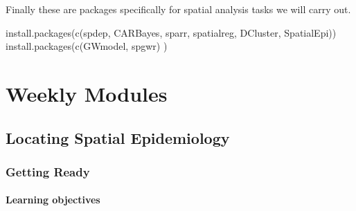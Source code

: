 \documentclass[
]{book}
\newenvironment{Shaded}{\begin{snugshade}}{\end{snugshade}}
\newcommand{\FunctionTok}[1]{\textcolor[rgb]{0.00,0.00,0.00}{#1}}
\newcommand{\NormalTok}[1]{#1}
\newcommand{\StringTok}[1]{\textcolor[rgb]{0.31,0.60,0.02}{#1}}
\begin{document}
Finally these are packages specifically for spatial analysis tasks we will carry out.

\begin{Shaded}
\begin{Highlighting}[]
\FunctionTok{install.packages}\NormalTok{(}\FunctionTok{c}\NormalTok{(}\StringTok{\textquotesingle{}spdep\textquotesingle{}}\NormalTok{, }\StringTok{\textquotesingle{}CARBayes\textquotesingle{}}\NormalTok{, }\StringTok{\textquotesingle{}sparr\textquotesingle{}}\NormalTok{, }\StringTok{\textquotesingle{}spatialreg\textquotesingle{}}\NormalTok{,  }\StringTok{\textquotesingle{}DCluster\textquotesingle{}}\NormalTok{, }\StringTok{\textquotesingle{}SpatialEpi\textquotesingle{}}\NormalTok{))}
\FunctionTok{install.packages}\NormalTok{(}\FunctionTok{c}\NormalTok{(}\StringTok{\textquotesingle{}GWmodel\textquotesingle{}}\NormalTok{, }\StringTok{\textquotesingle{}spgwr\textquotesingle{}}\NormalTok{) )}
\end{Highlighting}
\end{Shaded}

\hypertarget{part-weekly-modules}{%
\part{Weekly Modules}\label{part-weekly-modules}}

\hypertarget{locating-spatial-epidemiology}{%
\chapter{Locating Spatial Epidemiology}\label{locating-spatial-epidemiology}}

\hypertarget{getting-ready}{%
\section{Getting Ready}\label{getting-ready}}

\hypertarget{learning-objectives}{%
\subsection{Learning objectives}\label{learning-objectives}}

 
  \providecommand{\huxb}[2]{\arrayrulecolor[RGB]{#1}\global\arrayrulewidth=#2pt}
  \providecommand{\huxvb}[2]{\color[RGB]{#1}\vrule width #2pt}
  \providecommand{\huxtpad}[1]{\rule{0pt}{#1}}
  \providecommand{\huxbpad}[1]{\rule[-#1]{0pt}{#1}}
\end{document}
